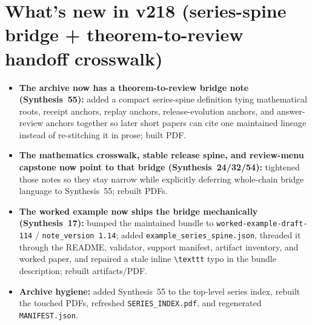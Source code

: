 \documentclass[11pt]{article}
\begin{document}
\section{What's new in v218 (series-spine bridge + theorem-to-review handoff crosswalk)}
\begin{itemize}[leftmargin=*]
\item \textbf{The archive now has a theorem-to-review bridge note (Synthesis~55):} added a compact series-spine definition tying mathematical roots, receipt anchors, replay anchors, release-evolution anchors, and answer-review anchors together so later short papers can cite one maintained lineage instead of re-stitching it in prose; built PDF.
\item \textbf{The mathematics crosswalk, stable release spine, and review-menu capstone now point to that bridge (Synthesis~24/32/54):} tightened those notes so they stay narrow while explicitly deferring whole-chain bridge language to Synthesis~55; rebuilt PDFs.
\item \textbf{The worked example now ships the bridge mechanically (Synthesis~17):} bumped the maintained bundle to \texttt{worked-example-draft-114} / \texttt{note\_version 1.14}; added \texttt{example\_series\_spine.json}, threaded it through the README, validator, support manifest, artifact inventory, and worked paper, and repaired a stale inline \texttt{\textbackslash texttt} typo in the bundle description; rebuilt artifacts/PDF.
\item \textbf{Archive hygiene:} added Synthesis~55 to the top-level series index, rebuilt the touched PDFs, refreshed \texttt{SERIES\_INDEX.pdf}, and regenerated \texttt{MANIFEST.json}.
\end{itemize}
\end{document}
